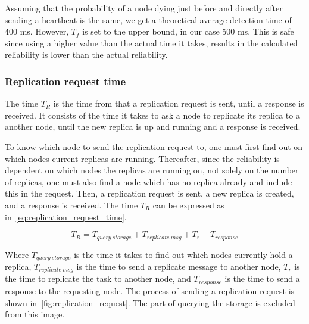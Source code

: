 \documentclass{cslthse-msc}
\begin{document}
Assuming that the probability of a node dying just before and directly after sending a heartbeat is the same, we get a theoretical average detection time of 400 ms. However, $T_f$ is set to the upper bound, in our case 500 ms. This is safe since using a higher value than the actual time it takes, results in the calculated reliability is lower than the actual reliability.


\subsubsection{Replication request time} \label{sec:replication_time}
The time $T_R$ is the time from that a replication request is sent, until a response is received. It consists of the time it takes to ask a node to replicate its replica to a another node, until the new replica is up and running and a response is received. 

To know which node to send the replication request to, one must first find out on which nodes current replicas are running. Thereafter, since the reliability is dependent on which nodes the replicas are running on, not solely on the number of replicas, one must also find a node which has no replica already and include this in the request. Then, a replication request is sent, a new replica is created, and a response is received. The time $T_R$ can be expressed as in~\cref{eq:replication_request_time}.

\begin{equation} \label{eq:replication_request_time}
T_R = T_{query\ storage} + T_{replicate\ msg} + T_{r} + T_{response}
\end{equation} 

Where $T_{query\ storage}$ is the time it takes to find out which nodes currently hold a replica, $T_{replicate\ msg}$ is the time to send a replicate message to another node, $T_{r}$ is the time to replicate the task to another node, and $T_{response}$ is the time to send a response to the requesting node. The process of sending a replication request is shown in~\cref{fig:replication_request}. The part of querying the storage is excluded from this image.
\end{document}
